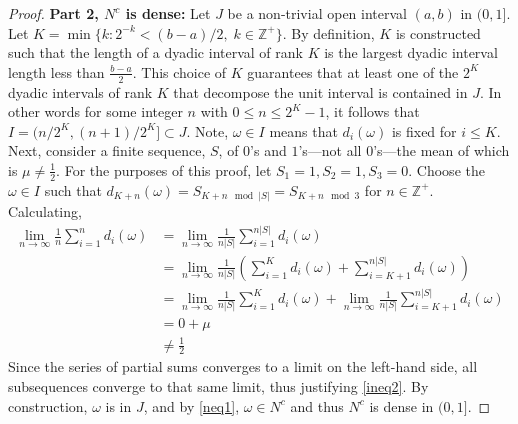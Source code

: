 \documentclass[letterpaper, 12pt]{article}
\newcommand{\Z}{\mathbb{Z}}
\newcommand{\sion}{\sum_{i=1}^n}
\newcommand{\sio}{\sum_{i=1}}
\begin{document}
\begin{enumerate}
\begin{proof}
\textbf{Part 2, $N^c$ is dense:} Let $J$ be a non-trivial open interval $(a,b)$ in $(0,1]$. Let $K = \min \{k : 2^{-k} < (b-a)/2, \; k \in \Z^+ \}$. By definition, $K$ is constructed such that the length of a dyadic interval of rank $K$ is the largest dyadic interval length less than $\frac{b-a}{2}$. This choice of $K$ guarantees that at least one of the $2^K$ dyadic intervals of rank $K$ that decompose the unit interval is contained in $J$. In other words for some integer $n$ with $0 \leq n \leq 2^{K} - 1$, it follows that $I = (n / 2^K, (n+1)/2^K] \subset J$. Note, $\omega \in I$ means that $d_i(\omega)$ is fixed for $i \leq K$. Next, consider a finite sequence, $S$, of $0$'s and $1$'s---not all $0$'s---the mean of which is $\mu \neq \frac{1}{2}$. For the purposes of this proof, let $S_1 = 1, S_2=1, S_3=0$. Choose the $\omega \in I$ such that $d_{K+n}(\omega) = S_{K+n \mod |S|} = S_{K+n \mod 3}$ for $n \in \Z^+$. Calculating,
\begin{align}
\label{ineq2}
\lim_{n \to \infty} \frac{1}{n} \sion d_i(\omega)
&= 
\lim_{n \to \infty} \frac{1}{n|S|} \sio^{n|S|} d_i(\omega) \\
&= 
\lim_{n \to \infty} \frac{1}{n|S|} 
\left(\sio^K d_i(\omega) + \sum_{i = K+1}^{n|S|} d_i(\omega) \right) \\
&=\lim_{n \to \infty} \frac{1}{n|S|} 
\sio^K d_i(\omega)
+ \lim_{n \to \infty} \frac{1}{n|S|} 
\sum_{i = K+1}^{n|S|} d_i(\omega) \\
&= 0 + \mu \\
& \neq \frac{1}{2}
\label{neq1}
\end{align}
Since the series of partial sums converges to a limit on the left-hand side, all subsequences converge to that same limit, thus justifying \eqref{ineq2}. By construction, $\omega$ is in $J$, and by \eqref{neq1}, $\omega \in N^c$ and thus $N^c$ is dense in $(0,1]$.
\end{proof}


\end{enumerate}
\end{document}
